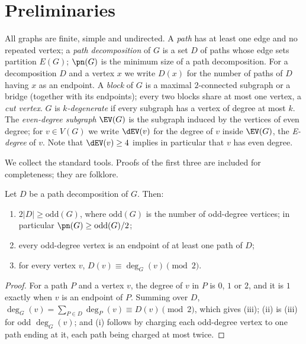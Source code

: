 \section{Preliminaries}\label{sec:prelim}

All graphs are finite, simple and undirected. A \emph{path} has at least one edge and no
repeated vertex; a \emph{path decomposition} of $G$ is a set $D$ of paths whose edge sets
partition $E(G)$; $\pn(G)$ is the minimum size of a path decomposition. For a decomposition $D$
and a vertex $x$ we write $D(x)$ for the number of paths of $D$ having $x$ as an endpoint. A
\emph{block} of $G$ is a maximal $2$-connected subgraph or a bridge (together with its
endpoints); every two blocks share at most one vertex, a \emph{cut vertex}. $G$ is
\emph{$k$-degenerate} if every subgraph has a vertex of degree at most $k$. The
\emph{even-degree subgraph} $\EV(G)$ is the subgraph induced by the vertices of even degree;
for $v\in V(G)$ we write $\dEV(v)$ for the degree of $v$ inside $\EV(G)$, the \emph{E-degree}
of $v$. Note that $\dEV(v)\ge 4$ implies in particular that $v$ has even degree.

We collect the standard tools. Proofs of the first three are included for completeness; they
are folklore.

\begin{lemma}\label{lem:LB1}
Let $D$ be a path decomposition of $G$. Then:
\begin{enumerate}[label=(\roman*),leftmargin=2em]
\item $2|D|\ge \mathrm{odd}(G)$, where $\mathrm{odd}(G)$ is the number of odd-degree vertices;
in particular $\pn(G)\ge \mathrm{odd}(G)/2$;
\item every odd-degree vertex is an endpoint of at least one path of $D$;
\item for every vertex $v$, $D(v)\equiv \deg_G(v)\pmod 2$.
\end{enumerate}
\end{lemma}

\begin{proof}
For a path $P$ and a vertex $v$, the degree of $v$ in $P$ is $0$, $1$ or $2$, and it is $1$
exactly when $v$ is an endpoint of $P$. Summing over $D$,
$\deg_G(v)=\sum_{P\in D}\deg_P(v)\equiv D(v)\pmod 2$, which gives (iii); (ii) is (iii) for odd
$\deg_G(v)$; and (i) follows by charging each odd-degree vertex to one path ending at it, each
path being charged at most twice.
\end{proof}

